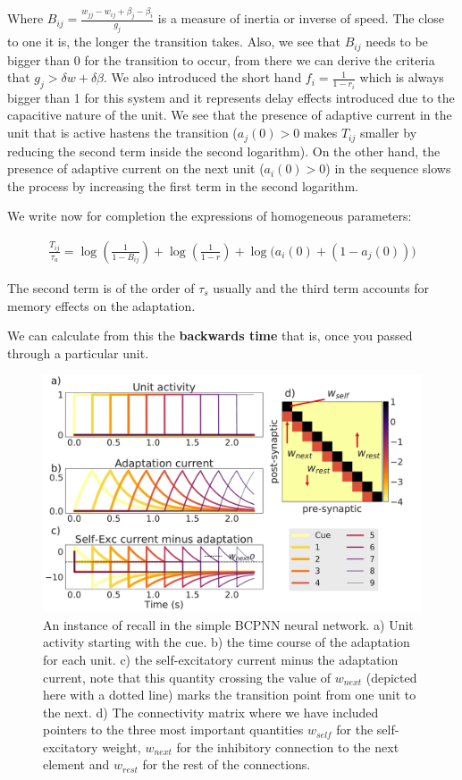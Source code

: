 \documentclass[10pt,a4paper]{article}
\begin{document}
Where $B_{ij} = \frac{w_{jj} - w_{ij} + \beta_j - \beta_i}{g_j}$ is a measure of inertia or inverse of speed. The close to one it is, the longer the transition takes. Also, we see that $B_{ij}$ needs to be bigger than 0 for the transition to occur, from there we can derive the criteria that $g_j > \delta w + \delta \beta$. We also introduced the short hand $f_i = \frac{1}{1 - r_i}$ which is always bigger than 1 for this system and it represents delay effects introduced due to the capacitive nature of the unit.  We see that the presence of adaptive current in the unit that is active hastens the transition ($a_j(0) > 0$  makes $T_{ij}$ smaller by reducing the second term inside the second logarithm). On the other hand, the presence of adaptive current on the next unit ($a_i(0) > 0$) in the sequence slows the process by increasing the first term in the second logarithm. 

We write now for completion the expressions of homogeneous parameters:

\begin{align*}
\frac{T_{ij}}{\tau_a} = \log \left(\frac{1}{1 - B_{ij}} \right) + \log \left( \frac{1}{1 - r} \right) + \log \bigg( a_i(0) + (1 - a_j(0)) \bigg) 
\end{align*}

The second term is of the order of $\tau_s$ usually and the third term accounts for memory effects on the adaptation.

We can calculate from this the \textbf{backwards time} that is, once you passed through a particular unit. 

\begin{figure}[H]
\centering
\includegraphics[scale=0.26]{simple_bcpnn_recall.pdf}
\caption{An instance of recall in the simple BCPNN neural network. a) Unit activity starting with the cue. b) the time course of the adaptation for each unit. c) the self-excitatory current minus the adaptation current, note that this quantity crossing the value of $w_{next}$ (depicted here with a dotted line) marks the transition point from one unit to the next. d) The connectivity matrix where we have included pointers to the three most important quantities $w_{self}$ for the self-excitatory weight, $w_{next}$ for the inhibitory connection to the next element and $w_{rest}$ for the rest of the connections.}
\label{fig:bcpnn_simple_recall}
\end{figure}
\end{document}
